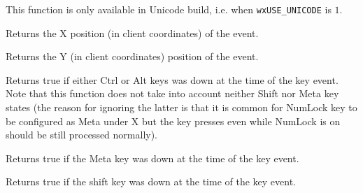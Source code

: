 This function is only available in Unicode build, i.e. when
\texttt{wxUSE\_UNICODE} is $1$.


\label{wxkeyeventgetx}


Returns the X position (in client coordinates) of the event.


\label{wxkeyeventgety}


Returns the Y (in client coordinates) position of the event.


\label{wxkeyeventhasmodifiers}


Returns true if either {\sc Ctrl} or {\sc Alt} keys was down
at the time of the key event. Note that this function does not take into
account neither {\sc Shift} nor {\sc Meta} key states (the reason for ignoring
the latter is that it is common for {\sc NumLock} key to be configured as
{\sc Meta} under X but the key presses even while {\sc NumLock} is on should
be still processed normally).


\label{wxkeyeventmetadown}


Returns true if the Meta key was down at the time of the key event.


\label{wxkeyeventshiftdown}


Returns true if the shift key was down at the time of the key event.

